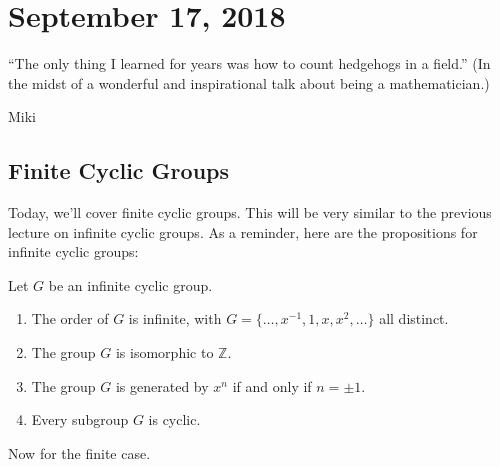 \section{September 17, 2018}

\epigraph{``The only thing I learned for years was how to count hedgehogs in a field.'' (In the midst of a wonderful and inspirational talk about being a mathematician.)}{Miki}

\subsection{Finite Cyclic Groups}

Today, we'll cover finite cyclic groups. This will be very similar to the previous lecture on infinite cyclic groups. As a reminder, here are the propositions for infinite cyclic groups:

\begin{proposition}
Let $G$ be an infinite cyclic group.
\begin{enumerate}
\item The order of $G$ is infinite, with $G = \{\dotsc,x^{-1},1,x,x^2,\dotsc\}$ all distinct.
\item The group $G$ is isomorphic to $\mathbb{Z}$.
\item The group $G$ is generated by $x^n$ if and only if $n = \pm 1$.
\item Every subgroup $G$ is cyclic.
\end{enumerate}
\end{proposition}

Now for the finite case. 

